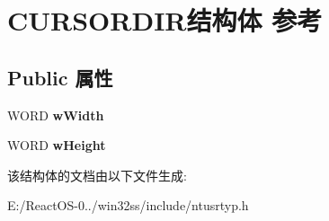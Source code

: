 \hypertarget{struct_c_u_r_s_o_r_d_i_r}{}\section{C\+U\+R\+S\+O\+R\+D\+I\+R结构体 参考}
\label{struct_c_u_r_s_o_r_d_i_r}
\subsection*{Public 属性}
\begin{DoxyCompactItemize}
\item 
\mbox{\label{struct_c_u_r_s_o_r_d_i_r_abec6d900f6a1d133331efa9790ab52e1}} 
W\+O\+RD {\bfseries w\+Width}
\item 
\mbox{\label{struct_c_u_r_s_o_r_d_i_r_a0b52e1ff8e18a588365280b6d5e32105}} 
W\+O\+RD {\bfseries w\+Height}
\end{DoxyCompactItemize}


该结构体的文档由以下文件生成\+:\begin{DoxyCompactItemize}
\item 
E\+:/\+React\+O\+S-\/0../win32ss/include/ntusrtyp.\+h\end{DoxyCompactItemize}
